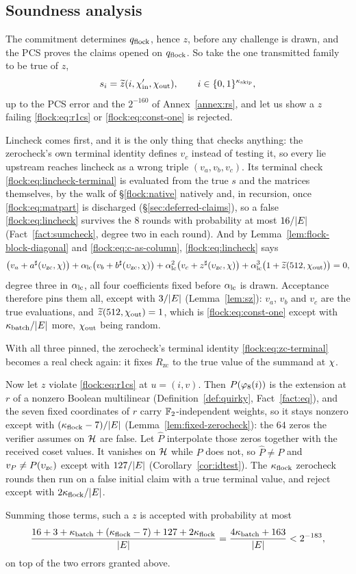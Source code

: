 \subsection{Soundness analysis}\label{flock:soundness}


The commitment determines $q_{\mathrm{flock}}$, hence $z$, before any challenge is drawn, and the PCS proves the claims opened on $q_{\mathrm{flock}}$. So take the one transmitted family to be true of $z$,
\[
s_i=\widetilde{z}(i,\chi'_{\mathrm{in}},\chi_{\mathrm{out}}),\qquad i\in\{0,1\}^{\kappa_{\mathrm{skip}}},
\]
up to the PCS error and the $2^{-160}$ of Annex~\ref{annex:rs}, and let us show a $z$ failing \eqref{flock:eq:r1cs} or \eqref{flock:eq:const-one} is rejected.

Lincheck comes first, and it is the only thing that checks anything: the zerocheck's own terminal identity defines $v_c$ instead of testing it, so every lie upstream reaches lincheck as a wrong triple $(v_a,v_b,v_c)$. Its terminal check \eqref{flock:eq:lincheck-terminal} is evaluated from the true $s$ and the matrices themselves, by the walk of \S\ref{flock:native} natively and, in recursion, once \eqref{flock:eq:matpart} is discharged (\S\ref{sec:deferred-claims}), so a false \eqref{flock:eq:lincheck} survives the $8$ rounds with probability at most $16/|E|$ (Fact~\ref{fact:sumcheck}, degree two in each round). And by Lemma~\ref{lem:flock-block-diagonal} and \eqref{flock:eq:c-as-column}, \eqref{flock:eq:lincheck} says
\[
\bigl(v_a+a^{\sharp}(\upsilon_{\mathrm{zc}},\chi)\bigr)+\alpha_{\mathrm{lc}}\bigl(v_b+b^{\sharp}(\upsilon_{\mathrm{zc}},\chi)\bigr)+\alpha_{\mathrm{lc}}^2\bigl(v_c+z^{\sharp}(\upsilon_{\mathrm{zc}},\chi)\bigr)+\alpha_{\mathrm{lc}}^3\bigl(1+\widetilde{z}(512,\chi_{\mathrm{out}})\bigr)=0,
\]
degree three in $\alpha_{\mathrm{lc}}$, all four coefficients fixed before $\alpha_{\mathrm{lc}}$ is drawn. Acceptance therefore pins them all, except with $3/|E|$ (Lemma~\ref{lem:sz}): $v_a$, $v_b$ and $v_c$ are the true evaluations, and $\widetilde{z}(512,\chi_{\mathrm{out}})=1$, which is \eqref{flock:eq:const-one} except with $\kappa_{\mathrm{batch}}/|E|$ more, $\chi_{\mathrm{out}}$ being random.

With all three pinned, the zerocheck's terminal identity \eqref{flock:eq:zc-terminal} becomes a real check again: it fixes $R_{\mathrm{zc}}$ to the true value of the summand at $\chi$.

Now let $z$ violate \eqref{flock:eq:r1cs} at $u=(i,v)$. Then $P(\varphi_{8}(i))$ is the extension at $r$ of a nonzero Boolean multilinear (Definition~\ref{def:quirky}, Fact~\ref{fact:eq}), and the seven fixed coordinates of $r$ carry $\mathbb{F}_2$-independent weights, so it stays nonzero except with $(\kappa_{\mathrm{flock}}-7)/|E|$ (Lemma~\ref{lem:fixed-zerocheck}): the $64$ zeros the verifier assumes on $\mathcal{H}$ are false. Let $\hat P$ interpolate those zeros together with the received coset values. It vanishes on $\mathcal{H}$ while $P$ does not, so $\hat P\neq P$ and $v_P\neq P(\upsilon_{\mathrm{zc}})$ except with $127/|E|$ (Corollary~\ref{cor:idtest}). The $\kappa_{\mathrm{flock}}$ zerocheck rounds then run on a false initial claim with a true terminal value, and reject except with $2\kappa_{\mathrm{flock}}/|E|$.

Summing those terms, such a $z$ is accepted with probability at most
\[
\frac{16+3+\kappa_{\mathrm{batch}}+(\kappa_{\mathrm{flock}}-7)+127+2\kappa_{\mathrm{flock}}}{|E|}=\frac{4\kappa_{\mathrm{batch}}+163}{|E|}<2^{-183},
\]
on top of the two errors granted above.
